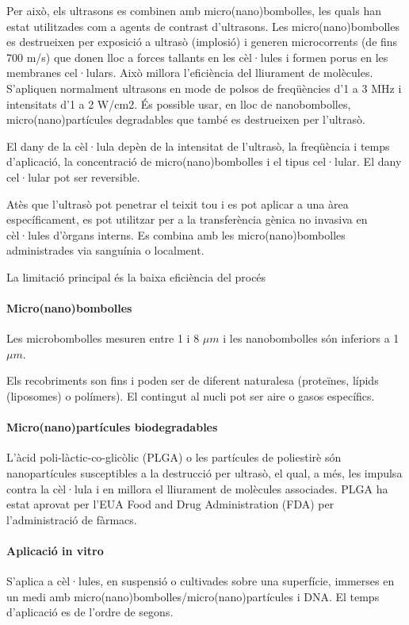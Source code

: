 Per això, els ultrasons es combinen amb micro(nano)bombolles, les quals han estat utilitzades com a agents de contrast d'ultrasons. Les micro(nano)bombolles es destrueixen per exposició a ultrasò (implosió) i generen microcorrents (de fins 700 m/s) que donen lloc a forces tallants en les cèl·lules i formen porus en les membranes cel·lulars. Això millora l'eficiència del lliurament de molècules. S'apliquen normalment ultrasons en mode de polsos de freqüències d'1 a 3 MHz i intensitats d'1 a 2 W/cm2. És possible usar, en lloc de nanobombolles, micro(nano)partícules degradables que també es destrueixen per l'ultrasò.

El dany de la cèl·lula depèn de la intensitat de l'ultrasò, la freqüència i temps d'aplicació, la concentració de micro(nano)bombolles i el tipus cel·lular. El dany cel·lular pot ser reversible.

Atès que l'ultrasò pot penetrar el teixit tou i es pot aplicar a una àrea específicament, es pot utilitzar per a la transferència gènica no invasiva en cèl·lules d'òrgans interns. Es combina amb les micro(nano)bombolles administrades via sanguínia o localment.

La limitació principal és la baixa eficiència del procés

\paragraph{Micro(nano)bombolles}
Les microbombolles mesuren entre 1 i 8 $\mu m$ i les nanobombolles són inferiors a 1 $\mu m$.

Els recobriments son fins i poden ser de diferent naturalesa (proteïnes, lípids (liposomes) o polímers). El contingut al nucli pot ser aire o gasos específics.

\paragraph{Micro(nano)partícules biodegradables}
L'àcid poli-làctic-co-glicòlic (PLGA) o les partícules de poliestirè són nanopartícules susceptibles a la destrucció per ultrasò, el qual, a més, les impulsa contra la cèl·lula i en millora el lliurament de molècules associades. PLGA ha estat aprovat per l'EUA Food and Drug Administration (FDA) per l'administració de fàrmacs.

\paragraph{Aplicació in vitro}
S'aplica a cèl·lules, en suspensió o cultivades sobre una superfície, immerses en un medi amb micro(nano)bombolles/micro(nano)partícules i DNA. El temps d'aplicació es de l'ordre de segons.

